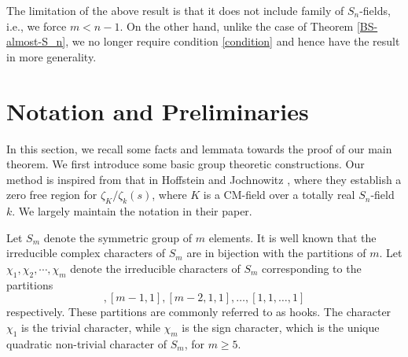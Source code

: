 \documentclass[12pt]{amsart}
\newtheorem{corollary}[theorem]{Corollary}
\theoremstyle{definition}
\newcommand{\rK}{\mathcal{K}}
\newcommand{\rL}{\mathcal{L}}
\begin{document}
The limitation of the above result is that it does not include family of $S_n$-fields, i.e., we force $m<n-1$. On the other hand, unlike the case of Theorem \ref{BS-almost-S_n}, we no longer require condition \eqref{condition} and hence have the result in more generality.
    
    








\bigskip
\section{Notation and Preliminaries}
\bigskip

% 

In this section, we recall some facts and lemmata towards the proof of our main theorem. We first introduce some basic group theoretic constructions. Our method is inspired from that in Hoffstein and Jochnowitz \cite{Hoff}, where they establish a zero free region for $\zeta_K/\zeta_k(s)$, where  $K$ is a CM-field over a totally real $S_n$-field $k$. We largely maintain the notation in their paper.
\medskip

 Let $S_m$ denote the symmetric group of $m$ elements. It is well known that the irreducible complex characters of $S_m$ are in bijection with the partitions of $m$. Let $\chi_1,\chi_2,\cdots, \chi_m$ denote the irreducible characters of $S_m$ corresponding to the partitions 
\begin{equation*}
    [m], [m-1,1],[m-2,1,1],\ldots, [1,1,\ldots,1]
\end{equation*}
 respectively. These partitions are commonly referred to as hooks. The character $\chi_1$ is the trivial character, while $\chi_m$ is the sign character, which is the unique quadratic non-trivial character of $S_m$, for $m\geq 5$.
 \medskip
\end{document}
